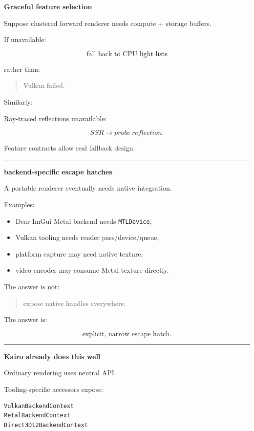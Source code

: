 \textbf{Graceful feature selection}

Suppose clustered forward renderer needs compute + storage buffers.

If unavailable:

\[
\boxed{
\text{fall back to CPU light lists}
}
\]

rather than:

\begin{quote}
Vulkan failed.
\end{quote}

Similarly:

Ray-traced reflections unavailable:

\[
SSR\rightarrow probe\ reflection.
\]

Feature contracts allow real fallback design.

\begin{center}\rule{0.5\linewidth}{0.5pt}\end{center}

\textbf{backend-specific escape hatches}

A portable renderer eventually needs native integration.

Examples:

\begin{itemize}
\tightlist
\item
  Dear ImGui Metal backend needs \texttt{MTLDevice},
\item
  Vulkan tooling needs render pass/device/queue,
\item
  platform capture may need native texture,
\item
  video encoder may consume Metal texture directly.
\end{itemize}

The answer is not:

\begin{quote}
expose native handles everywhere.
\end{quote}

The answer is:

\[
\boxed{
\text{explicit, narrow escape hatch}.
}
\]

\begin{center}\rule{0.5\linewidth}{0.5pt}\end{center}

\textbf{Kairo already does this well}

Ordinary rendering uses neutral API.

Tooling-specific accessors expose:

\begin{verbatim}
VulkanBackendContext
MetalBackendContext
Direct3D12BackendContext
\end{verbatim}

